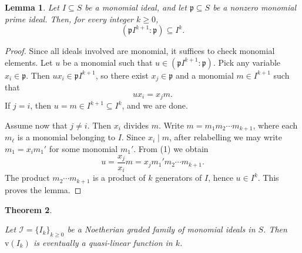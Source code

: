 \documentclass[11pt,reqno,a4paper]{amsart}
\newtheorem{theorem}{Theorem}[section]
\newtheorem{lemma}[theorem]{Lemma}
\theoremstyle{definition}
\begin{document}
\begin{lemma}\label{pI^k+1:p}
Let \(I \subseteq S\) be a monomial ideal, and let \(\mathfrak{p} \subseteq S\) be a nonzero monomial prime ideal. Then, for every integer \(k \ge 0\),
\[
(\mathfrak{p} I^{k+1} : \mathfrak{p}) \subseteq I^k.
\]
\end{lemma}

\begin{proof}
Since all ideals involved are monomial, it suffices to check monomial elements. Let \(u\) be a monomial such that \(u \in (\mathfrak{p} I^{k+1} : \mathfrak{p})\). Pick any variable \(x_i \in \mathfrak{p}\). Then \(u x_i \in \mathfrak{p} I^{k+1}\), so there exist \(x_j \in \mathfrak{p}\) and a monomial \(m \in I^{k+1}\) such that
\[
u x_i = x_j m. \tag{1}
\]
If \(j = i\), then \(u = m \in I^{k+1} \subseteq I^k\), and we are done.

 Assume now that \(j \ne i\). Then \(x_i\) divides \(m\). Write \(m = m_1 m_2 \cdots m_{k+1}\), where each \(m_\ell\) is a monomial belonging to \(I\). Since \(x_i \mid m\), after relabelling we may write \(m_1 = x_i m_1'\) for some monomial \(m_1'\). From (1) we obtain
\[
u = \frac{x_j}{x_i} m = x_j m_1' m_2 \cdots m_{k+1}.
\]
The product \(m_2 \cdots m_{k+1}\) is a product of \(k\) generators of \(I\), hence \(u \in I^k\). This proves the lemma. \qedhere
\end{proof}




\begin{theorem}\label{visquasilinear}

Let \(\mathcal{I} = \{I_k\}_{k \geq 0}\) be a Noetherian graded family of monomial ideals in \(S \). Then \(\mathrm{v}(I_k)\) is  eventually  a quasi-linear function in \(k\). 
\end{theorem}
\end{document}
